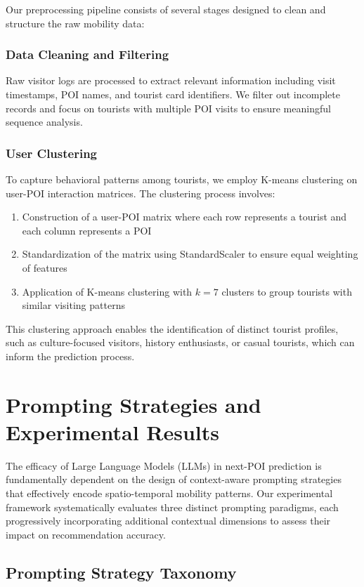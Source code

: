 \documentclass[12pt,a4paper]{article}
\begin{document}
Our preprocessing pipeline consists of several stages designed to clean and structure the raw mobility data:

\subsubsection{Data Cleaning and Filtering}
Raw visitor logs are processed to extract relevant information including visit timestamps, POI names, and tourist card identifiers. We filter out incomplete records and focus on tourists with multiple POI visits to ensure meaningful sequence analysis.

\subsubsection{User Clustering}
To capture behavioral patterns among tourists, we employ K-means clustering on user-POI interaction matrices. The clustering process involves:

\begin{enumerate}
\item Construction of a user-POI matrix where each row represents a tourist and each column represents a POI
\item Standardization of the matrix using StandardScaler to ensure equal weighting of features
\item Application of K-means clustering with $k=7$ clusters to group tourists with similar visiting patterns
\end{enumerate}

This clustering approach enables the identification of distinct tourist profiles, such as culture-focused visitors, history enthusiasts, or casual tourists, which can inform the prediction process.

\section{Prompting Strategies and Experimental Results}

The efficacy of Large Language Models (LLMs) in next-POI prediction is fundamentally dependent on the design of context-aware prompting strategies that effectively encode spatio-temporal mobility patterns. Our experimental framework systematically evaluates three distinct prompting paradigms, each progressively incorporating additional contextual dimensions to assess their impact on recommendation accuracy.

\subsection{Prompting Strategy Taxonomy}
\end{document}
